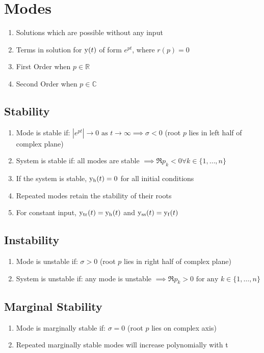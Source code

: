 \section*{Modes}
\begin{enumerate}
    \item Solutions which are possible without any input
    \item Terms in solution for \( \func{y}[t] \) of form \( e^{pt} \), where \( r(p) = 0 \)
    \item First Order when \( p \in \mathbb{R} \)
    \item Second Order when \( p \in \mathbb{C} \)
\end{enumerate}

\subsection*{Stability}
\begin{enumerate}
    \item Mode is stable if: \( |e^{pt}| \to 0 \text{ as } t \to \infty \implies \sigma < 0 \) (root \( p \) lies in left half of complex plane)
    \item System is stable if: all modes are stable \( \implies \Re{p_k} < 0 \forall k \in \{1, \dots, n\} \)
    \item If the system is stable, \( \func{y_h}[t] = 0 \) for all initial conditions
    \item Repeated modes retain the stability of their roots
    \item For constant input, \( \func{y_{\text{tr}}}[t] = \func{y_h}[t] \) and \( \func{y_{\text{ss}}}[t] = \func{y_f}[t] \)
\end{enumerate}

\subsection*{Instability}
\begin{enumerate}
    \item Mode is unstable if: \( \sigma > 0 \) (root \( p \) lies in right half of complex plane)
    \item System is unstable if: any mode is unstable \( \implies \Re{p_k} > 0 \text{ for any } k \in \{1, \dots, n\} \)
\end{enumerate}

\subsection*{Marginal Stability}
\begin{enumerate}
    \item Mode is marginally stable if: \( \sigma = 0 \) (root \( p \) lies on complex axis)
    \item Repeated marginally stable modes will increase polynomially with t
\end{enumerate}

